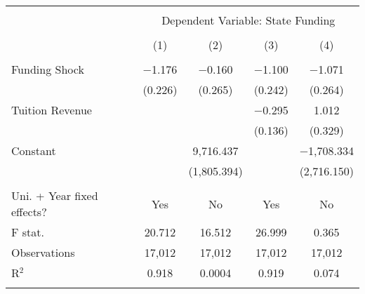 
\begin{tabular}{@{\extracolsep{5pt}}lcccc} 
\\[-1.8ex]\hline 
\hline \\[-1.8ex] 
 & \multicolumn{4}{c}{Dependent Variable: State Funding} \\ 
\cline{2-5} 
\\[-1.8ex] & (1) & (2) & (3) & (4)\\ 
\hline \\[-1.8ex] 
 Funding Shock & $-$1.176 & $-$0.160 & $-$1.100 & $-$1.071 \\ 
  & (0.226) & (0.265) & (0.242) & (0.264) \\ 
  Tuition Revenue &  &  & $-$0.295 & 1.012 \\ 
  &  &  & (0.136) & (0.329) \\ 
  Constant &  & 9,716.437 &  & $-$1,708.334 \\ 
  &  & (1,805.394) &  & (2,716.150) \\ 
 \hline \\[-1.8ex] 
Uni. + Year fixed effects? & Yes & No & Yes & No \\ 
F stat. & 20.712 & 16.512 & 26.999 & 0.365 \\ 
Observations & 17,012 & 17,012 & 17,012 & 17,012 \\ 
R$^{2}$ & 0.918 & 0.0004 & 0.919 & 0.074 \\ 
\hline 
\hline \\[-1.8ex] 
\end{tabular} 
